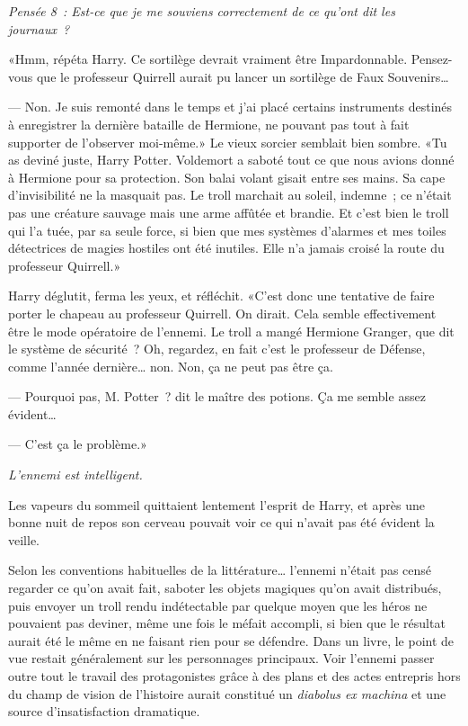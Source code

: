 \emph{Pensée 8~: Est-ce que je me souviens correctement de ce qu'ont dit les journaux~?}

«Hmm, répéta Harry. Ce sortilège devrait vraiment être Impardonnable. Pensez-vous que le professeur Quirrell aurait pu lancer un sortilège de Faux Souvenirs…

--- Non. Je suis remonté dans le temps et j'ai placé certains instruments destinés à enregistrer la dernière bataille de Hermione, ne pouvant pas tout à fait supporter de l'observer moi-même.» Le vieux sorcier semblait bien sombre. «Tu as deviné juste, Harry Potter. Voldemort a saboté tout ce que nous avions donné à Hermione pour sa protection. Son balai volant gisait entre ses mains. Sa cape d'invisibilité ne la masquait pas. Le troll marchait au soleil, indemne~; ce n'était pas une créature sauvage mais une arme affûtée et brandie. Et c'est bien le troll qui l'a tuée, par sa seule force, si bien que mes systèmes d'alarmes et mes toiles détectrices de magies hostiles ont été inutiles. Elle n'a jamais croisé la route du professeur Quirrell.»

Harry déglutit, ferma les yeux, et réfléchit. «C'est donc une tentative de faire porter le chapeau au professeur Quirrell. On dirait. Cela semble effectivement être le mode opératoire de l'ennemi. Le troll a mangé Hermione Granger, que dit le système de sécurité~? Oh, regardez, en fait c'est le professeur de Défense, comme l'année dernière… non. Non, ça ne peut pas être ça.

--- Pourquoi pas, M. Potter~? dit le maître des potions. Ça me semble assez évident…

--- C'est ça le problème.»

\emph{L'ennemi est intelligent.}

Les vapeurs du sommeil quittaient lentement l'esprit de Harry, et après une bonne nuit de repos son cerveau pouvait voir ce qui n'avait pas été évident la veille.

Selon les conventions habituelles de la littérature… l'ennemi n'était pas censé regarder ce qu'on avait fait, saboter les objets magiques qu'on avait distribués, puis envoyer un troll rendu indétectable par quelque moyen que les héros ne pouvaient pas deviner, même une fois le méfait accompli, si bien que le résultat aurait été le même en ne faisant rien pour se défendre. Dans un livre, le point de vue restait généralement sur les personnages principaux. Voir l'ennemi passer outre tout le travail des protagonistes grâce à des plans et des actes entrepris hors du champ de vision de l'histoire aurait constitué un \emph{diabolus ex machina} et une source d'insatisfaction dramatique.

